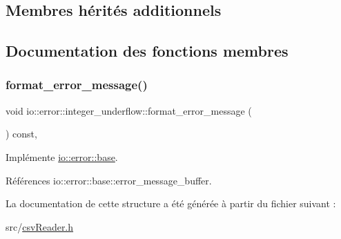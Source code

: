 \subsection*{Membres hérités additionnels}


\subsection{Documentation des fonctions membres}
\mbox{\label{structio_1_1error_1_1integer__underflow_a2ded9c7e982403877055514543207847}} 
\subsubsection{\texorpdfstring{format\+\_\+error\+\_\+message()}{format\_error\_message()}}
{\footnotesize\ttfamily void io\+::error\+::integer\+\_\+underflow\+::format\+\_\+error\+\_\+message (\begin{DoxyParamCaption}{ }\end{DoxyParamCaption}) const\hspace{0.3cm}{\ttfamily [inline]}, {\ttfamily [virtual]}}



Implémente \hyperlink{structio_1_1error_1_1base_a7d9ff6a31b716a24f056cf8a3e15191d}{io\+::error\+::base}.



Références io\+::error\+::base\+::error\+\_\+message\+\_\+buffer.



La documentation de cette structure a été générée à partir du fichier suivant \+:\begin{DoxyCompactItemize}
\item 
src/\hyperlink{csvReader_8h}{csv\+Reader.\+h}\end{DoxyCompactItemize}
